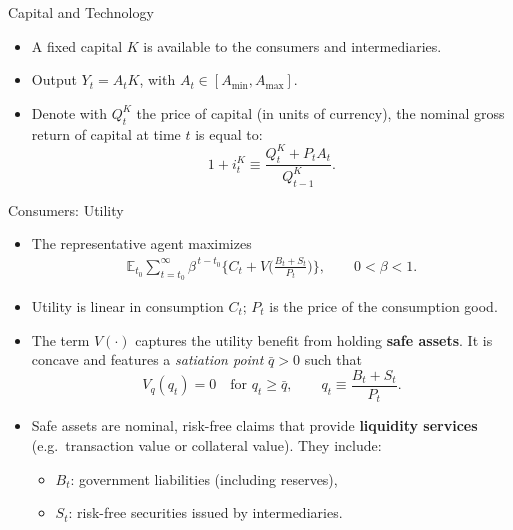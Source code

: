 \documentclass[11pt,aspectratio=169]{beamer}
\newcommand{\E}{\mathbb{E}}
\begin{document}
\begin{frame}{Capital and Technology}
\begin{itemize}
  \item A fixed capital $K$ is available to the consumers and intermediaries.
   \vspace{0.5em}
 
  \item Output $Y_t=A_t K$, with $A_t\in[A_{\min},A_{\max}]$.
   \vspace{0.5em}
 
  \item Denote with $Q_t^K$ the price of capital (in units of currency), the nominal gross return of capital at time $t$ is equal to:
  \[ 1+i_{t}^K\equiv\frac{Q_t^K+P_t A_t}{Q_{t-1}^K}. \]
\end{itemize}
\end{frame}



\begin{frame}{Consumers: Utility}
\small
\begin{itemize}
\item The representative agent maximizes
\begin{align}
\E_{t_0}\sum_{t=t_0}^{\infty}\beta^{\,t-t_0}
\Big\{ C_t + V\!\Big(\tfrac{B_t + S_t}{P_t}\Big) \Big\},
\qquad 0<\beta<1.
\label{4.1}
\end{align}

\item Utility is linear in consumption $C_t$; $P_t$ is the price of the consumption good.
\vspace{0.3em}

\item The term $V(\cdot)$ captures the utility benefit from holding \textbf{safe assets}. 
It is concave and features a \emph{satiation point} $\bar q > 0$ such that 
\[
V_q(q_t)=0 \quad \text{for } q_t\ge \bar q,
\qquad 
q_t \equiv \frac{B_t + S_t}{P_t}.
\]

\item Safe assets are nominal, risk-free claims that provide \textbf{liquidity services} 
(e.g.\ transaction value or collateral value).  
They include:
\begin{itemize}
  \item $B_t$: government liabilities (including reserves),
  \item $S_t$: risk-free securities issued by intermediaries.
\end{itemize}

\end{itemize}
\end{frame}
\end{document}
